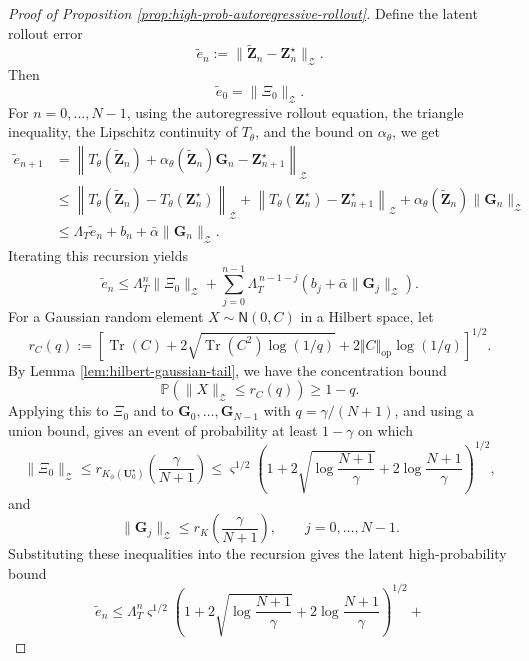 \documentclass[11pt]{article}
\newcommand{\wt}{\widetilde}
\begin{document}
\begin{proof}[Proof of Proposition \ref{prop:high-prob-autoregressive-rollout}]
Define the latent rollout error
\[
    \widetilde e_n
    :=
    \|\widetilde{\mathbf Z}_n-\mathbf Z_n^\star\|_{\mathcal Z}.
\]
Then
\[
    \widetilde e_0=\|\Xi_0\|_{\mathcal Z}.
\]
For $n=0,\ldots,N-1$, using the autoregressive rollout equation, the triangle inequality, the
Lipschitz continuity of $T_\theta$, and the bound on $\alpha_\theta$, we get
\[
\begin{aligned}
    \widetilde e_{n+1}
    &=
    \left\|
    T_\theta(\widetilde{\mathbf Z}_n)
    +
    \alpha_\theta(\widetilde{\mathbf Z}_n)\mathbf G_n
    -
    \mathbf Z_{n+1}^\star
    \right\|_{\mathcal Z}
    \\
    &\le
    \left\|
    T_\theta(\widetilde{\mathbf Z}_n)
    -
    T_\theta(\mathbf Z_n^\star)
    \right\|_{\mathcal Z}
    +
    \left\|
    T_\theta(\mathbf Z_n^\star)
    -
    \mathbf Z_{n+1}^\star
    \right\|_{\mathcal Z}
    +
    \alpha_\theta(\widetilde{\mathbf Z}_n)\|\mathbf G_n\|_{\mathcal Z}
    \\
    &\le
    \Lambda_T\widetilde e_n
    +
    b_n
    +
    \bar\alpha\|\mathbf G_n\|_{\mathcal Z}.
\end{aligned}
\]
Iterating this recursion yields
\[
    \widetilde e_n
    \le
    \Lambda_T^n\|\Xi_0\|_{\mathcal Z}
    +
    \sum_{j=0}^{n-1}
    \Lambda_T^{\,n-1-j}
    \left(
        b_j+\bar\alpha\|\mathbf G_j\|_{\mathcal Z}
    \right).
\]
For a Gaussian random element $X\sim\mathsf N(0,C)$ in a Hilbert space, let
$$r_C(q):=\left[\operatorname{Tr}(C)+2\sqrt{\operatorname{Tr}(C^2)\log(1/q)}+2\Vert C\Vert_\mathrm{op}\log(1/q)\right]^{1/2}.$$
By Lemma \ref{lem:hilbert-gaussian-tail}, we have the concentration bound
\[
    \mathbb P
    \left(
    \|X\|_{\mathcal Z}
    \le
    r_C(q)
    \right)
    \ge
    1-q.
\]
Applying this to $\Xi_0$ and to $\mathbf G_0,\ldots,\mathbf G_{N-1}$ with $q=\gamma/(N+1)$, and using a union bound, gives an event of probability at least $1-\gamma$
on which
\[
    \|\Xi_0\|_{\mathcal Z}
    \le
    r_{K_\phi(\mathbf U_0^\star)}\!\left(\frac{\gamma}{N+1}\right)\leq\varsigma^{1/2}\left(1+2\sqrt{\log\frac{N+1}{\gamma}}+2\log\frac{N+1}{\gamma}\right)^{1/2},
\]
and
\[
    \|\mathbf G_j\|_{\mathcal Z}
    \le
    r_K\!\left(\frac{\gamma}{N+1}\right),
    \qquad
    j=0,\ldots,N-1.
\]
Substituting these inequalities into the recursion gives the latent high-probability bound
\begin{equation*}
    \wt e_n\leq \Lambda_T^n
    \varsigma^{1/2}\left(1+2\sqrt{\log\frac{N+1}{\gamma}}+2\log\frac{N+1}{\gamma}\right)^{1/2}+

\end{equation*}
\end{proof}
\end{document}
